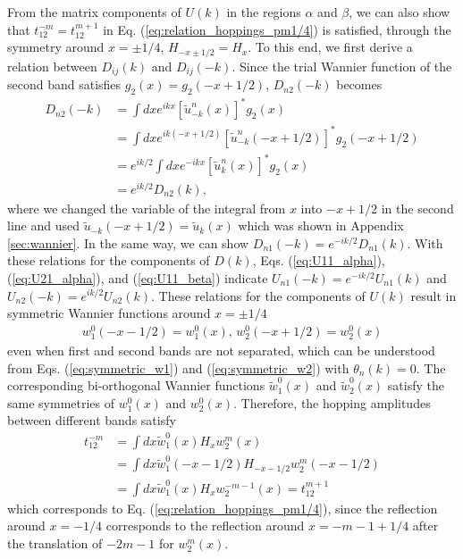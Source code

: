 \documentclass[prb,superscriptaddress,floatfix,twocolumn,showpacs]{revtex4-2}
\begin{document}
From the matrix components of $U(k)$ in the regions $\alpha$ and $\beta$, we can also show that $t_{12}^{-m}=t_{12}^{m+1}$ in Eq. (\ref{eq:relation_hoppings_pm1/4}) is satisfied, through the symmetry around $x=\pm1/4$, $H_{-x\pm1/2}=H_x$. 
To this end, we first derive a relation between $D_{ij}(k)$ and $D_{ij}(-k)$. 
Since the trial Wannier function of the second band satisfies $g_2(x)=g_2(-x+1/2)$, $D_{n2}(-k)$ becomes
\begin{align}
    D_{n2}(-k)&=\int dxe^{ikx}[\tilde{u}_{-k}^n(x)]^\ast g_2(x)\nonumber\\
    &=\int dxe^{ik(-x+1/2)}[\tilde{u}_{-k}^n(-x+1/2)]^\ast g_2(-x+1/2)\nonumber\\
    &=e^{ik/2}\int dxe^{-ikx}[\tilde{u}_{k}^n(x)]^\ast g_2(x)\nonumber\\
    &=e^{ik/2}D_{n2}(k),
    \label{eq:reflection_D}
\end{align}
where we changed the variable of the integral from $x$ into $-x+1/2$ in the second line and used $\tilde{u}_{-k}(-x+1/2)=\tilde{u}_k(x)$ which was shown in Appendix \ref{sec:wannier}. 
In the same way, we can show $D_{n1}(-k)=e^{-ik/2}D_{n1}(k)$. 
With these relations for the components of $D(k)$, Eqs. (\ref{eq:U11_alpha}), (\ref{eq:U21_alpha}), and (\ref{eq:U11_beta}) indicate $U_{n1}(-k)=e^{-ik/2}U_{n1}(k)$ and $U_{n2}(-k)=e^{ik/2}U_{n2}(k)$. 
These relations for the components of $U(k)$ result in symmetric Wannier functions around $x=\pm1/4$ 
\begin{align}
    w_1^0(-x-1/2)=w_1^0(x),\,w_2^0(-x+1/2)=w_2^0(x)
    \label{eq:symmetric-wannier-functions}
\end{align}
even when first and second bands are not separated, which can be understood from Eqs. (\ref{eq:symmetric_w1}) and (\ref{eq:symmetric_w2}) with $\theta_n(k)=0$. 
The corresponding bi-orthogonal Wannier functions $\tilde{w}_1^0(x)$ and $\tilde{w}_2^0(x)$ satisfy the same symmetries of $w_1^0(x)$ and $w_2^0(x)$. 
Therefore, the hopping amplitudes between different bands satisfy 
\begin{align}
    t_{12}^{-m}&=\int dx\tilde{w}_1^0(x)H_xw_2^m(x)\nonumber\\
    &=\int dx\tilde{w}_1^0(-x-1/2)H_{-x-1/2}w_2^m(-x-1/2)\nonumber\\
    &=\int dx\tilde{w}_1^0(x)H_xw_2^{-m-1}(x)=t_{12}^{m+1}
    \label{eq:hopping_symmetric_pm1/4}
\end{align}
which corresponds to Eq. (\ref{eq:relation_hoppings_pm1/4}), since the reflection around $x=-1/4$ corresponds to the reflection around $x=-m-1+1/4$ after the translation of $-2m-1$ for $w_2^m(x)$.  



\end{document}
